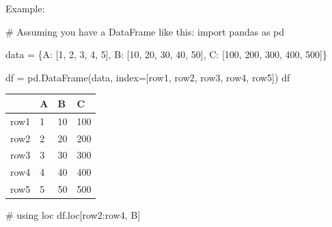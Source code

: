 \documentclass[
  letterpaper,
  DIV=11,
  numbers=noendperiod]{scrreprt}
\newenvironment{Shaded}{\begin{snugshade}}{\end{snugshade}}
\newcommand{\CommentTok}[1]{\textcolor[rgb]{0.37,0.37,0.37}{#1}}
\newcommand{\DecValTok}[1]{\textcolor[rgb]{0.68,0.00,0.00}{#1}}
\newcommand{\ImportTok}[1]{\textcolor[rgb]{0.00,0.46,0.62}{#1}}
\newcommand{\NormalTok}[1]{\textcolor[rgb]{0.00,0.23,0.31}{#1}}
\newcommand{\OperatorTok}[1]{\textcolor[rgb]{0.37,0.37,0.37}{#1}}
\newcommand{\StringTok}[1]{\textcolor[rgb]{0.13,0.47,0.30}{#1}}
\begin{document}
Example:

\begin{Shaded}
\begin{Highlighting}[]
\CommentTok{\# Assuming you have a DataFrame like this:}
\ImportTok{import}\NormalTok{ pandas }\ImportTok{as}\NormalTok{ pd}

\NormalTok{data }\OperatorTok{=}\NormalTok{ \{}\StringTok{\textquotesingle{}A\textquotesingle{}}\NormalTok{: [}\DecValTok{1}\NormalTok{, }\DecValTok{2}\NormalTok{, }\DecValTok{3}\NormalTok{, }\DecValTok{4}\NormalTok{, }\DecValTok{5}\NormalTok{],}
        \StringTok{\textquotesingle{}B\textquotesingle{}}\NormalTok{: [}\DecValTok{10}\NormalTok{, }\DecValTok{20}\NormalTok{, }\DecValTok{30}\NormalTok{, }\DecValTok{40}\NormalTok{, }\DecValTok{50}\NormalTok{],}
        \StringTok{\textquotesingle{}C\textquotesingle{}}\NormalTok{: [}\DecValTok{100}\NormalTok{, }\DecValTok{200}\NormalTok{, }\DecValTok{300}\NormalTok{, }\DecValTok{400}\NormalTok{, }\DecValTok{500}\NormalTok{]\}}

\NormalTok{df }\OperatorTok{=}\NormalTok{ pd.DataFrame(data, index}\OperatorTok{=}\NormalTok{[}\StringTok{\textquotesingle{}row1\textquotesingle{}}\NormalTok{, }\StringTok{\textquotesingle{}row2\textquotesingle{}}\NormalTok{, }\StringTok{\textquotesingle{}row3\textquotesingle{}}\NormalTok{, }\StringTok{\textquotesingle{}row4\textquotesingle{}}\NormalTok{, }\StringTok{\textquotesingle{}row5\textquotesingle{}}\NormalTok{])}
\NormalTok{df}
\end{Highlighting}
\end{Shaded}

\begin{longtable}[]{@{}llll@{}}
\toprule\noalign{}
& A & B & C \\
\midrule\noalign{}
\endhead
\bottomrule\noalign{}
\endlastfoot
row1 & 1 & 10 & 100 \\
row2 & 2 & 20 & 200 \\
row3 & 3 & 30 & 300 \\
row4 & 4 & 40 & 400 \\
row5 & 5 & 50 & 500 \\
\end{longtable}

\begin{Shaded}
\begin{Highlighting}[]
\CommentTok{\# using \textquotesingle{}loc\textquotesingle{}}
\NormalTok{df.loc[}\StringTok{\textquotesingle{}row2\textquotesingle{}}\NormalTok{:}\StringTok{\textquotesingle{}row4\textquotesingle{}}\NormalTok{, }\StringTok{\textquotesingle{}B\textquotesingle{}}\NormalTok{]}
\end{Highlighting}
\end{Shaded}
\end{document}
